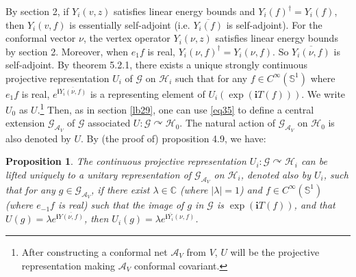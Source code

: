 \documentclass[12pt,a4paper]{article}
\theoremstyle{definition}
\theoremstyle{plain}
\newtheorem{pp}[df]{Proposition}
\newcommand{\mc}{\mathcal}
\newcommand{\ovl}{\overline}
\newcommand{\GAV}{\mathscr G_{\mathcal A_V}}
\newcommand{\scr}{\mathscr}
\newcommand{\im}{\mathbf{i}}
\newcommand{\mbb}{\mathbb}
\numberwithin{equation}{subsection}
\begin{document}
By \cite{TL99} section 2, if $Y_i(v,z)$ satisfies linear energy bounds and $Y_i(f)^\dagger=Y_i(f)$, then $Y_i(v,f)$ is essentially self-adjoint (i.e. $\ovl{Y_i(f)}$ is self-adjoint). For the conformal vector $\nu$, the vertex operator $Y_i(\nu,z)$ satisfies linear energy bounds by \cite{BS90} section 2. Moreover, when $e_1f$ is real, $Y_i(\nu,f)^\dagger=Y_i(\nu,f)$. So $\ovl{Y_i(\nu,f)}$ is self-adjoint. By \cite{TL99} theorem 5.2.1, there exists a unique strongly continuous projective representation $U_i$ of $\scr G$ on $\mc H_i$ such that for any $f\in C^\infty(\mbb S^1)$ where $e_1f$ is real, $e^{\im\ovl{Y_i(\nu,f)}}$ is a representing element of $U_i(\exp(\im T(f)))$. We write $U_0$ as $U$.\footnote{After constructing a conformal net $\mc A_V$ from $V$, $U$ will be the projective representation making $\mc A_V$ conformal covariant.} Then, as in section \ref{lb29}, one can use  \eqref{eq35} to define  a central extension $\GAV$ of $\scr G$ associated $U:\scr G\curvearrowright\mc H_0$. The natural action of $\GAV$ on $\mc H_0$ is also denoted by $U$.  By (the proof of) \cite{Gui21a} proposition 4.9, we have:

\begin{pp}\label{lb46}
The continuous projective representation $U_i:\scr G\curvearrowright\mc H_i$ can be lifted uniquely to a  unitary representation  of $\GAV$ on $\mc H_i$, denoted also by $U_i$,  such that for any $g\in\GAV$, if there exist $\lambda\in\mbb C$ (where $|\lambda|=1$) and   $f\in C^\infty(\mbb S^1)$ (where $e_{-1}f$ is real) such that the image of $g$ in $\scr G$ is $\exp(\im T(f))$,  and that $U(g)=\lambda e^{\im \ovl{Y(\nu,f)}}$, then $U_i(g)=\lambda e^{\im\ovl{Y_i}(\nu,f)}$.
\end{pp}
\end{document}
